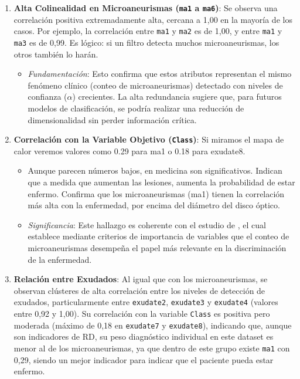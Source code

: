 \begin{enumerate}
    \item \textbf{Alta Colinealidad en Microaneurismas (\texttt{ma1} a \texttt{ma6})}: Se observa una correlación positiva extremadamente alta, cercana a 1,00 en la mayoría de los casos. Por ejemplo, la correlación entre \texttt{ma1} y \texttt{ma2} es de 1,00, y entre \texttt{ma1} y \texttt{ma3} es de 0,99. Es lógico: si un filtro detecta muchos microaneurismas, los otros también lo harán.
    \begin{itemize}
        \item \textit{Fundamentación}: Esto confirma que estos atributos representan el mismo fenómeno clínico (conteo de microaneurismas) detectado con niveles de confianza ($\alpha$) crecientes. La alta redundancia sugiere que, para futuros modelos de clasificación, se podría realizar una reducción de dimensionalidad sin perder información crítica.
    \end{itemize}
    \item \textbf{Correlación con la Variable Objetivo (\texttt{Class})}: Si miramos el mapa de calor veremos valores como 0.29 para ma1 o 0.18 para exudate8.
    \begin{itemize}
        \item Aunque parecen números bajos, en medicina son significativos. Indican que a medida que aumentan las lesiones, aumenta la probabilidad de estar enfermo. Confirma que los microaneurismas (ma1) tienen la correlación más alta con la enfermedad, por encima del diámetro del disco óptico.
        \item \textit{Significancia}: Este hallazgo es coherente con el estudio de \textcite{casanova2014application}, el cual establece mediante criterios de importancia de variables que el conteo de microaneurismas desempeña el papel más relevante en la discriminación de la enfermedad.
    \end{itemize}
    \item \textbf{Relación entre Exudados}: Al igual que con los microaneurismas, se observan clústeres de alta correlación entre los niveles de detección de exudados, particularmente entre \texttt{exudate2}, \texttt{exudate3} y \texttt{exudate4} (valores entre 0,92 y 1,00). Su correlación con la variable \texttt{Class} es positiva pero moderada (máximo de 0,18 en \texttt{exudate7} y \texttt{exudate8}), indicando que, aunque son indicadores de RD, su peso diagnóstico individual en este dataset es menor al de los microaneurismas, ya que dentro de este grupo existe \texttt{ma1} con 0,29, siendo un mejor indicador para indicar que el paciente pueda estar enfermo.

\end{enumerate}
